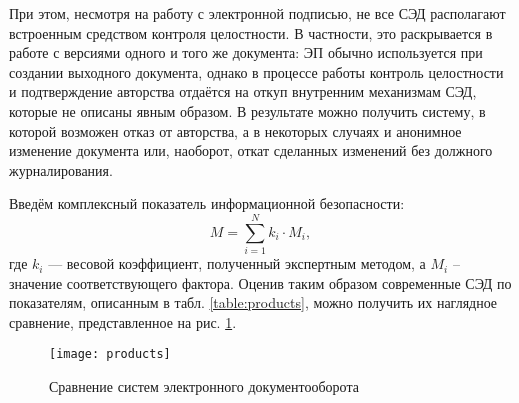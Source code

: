 При этом, несмотря на работу с электронной подписью, не все СЭД располагают встроенным средством контроля целостности. В частности, это раскрывается в работе с версиями одного и того же документа: ЭП обычно используется при создании выходного документа, однако в процессе работы контроль целостности и подтверждение авторства отдаётся на откуп внутренним механизмам СЭД, которые не описаны явным образом. В результате можно получить систему, в которой возможен отказ от авторства, а в некоторых случаях и анонимное изменение документа или, наоборот, откат сделанных изменений без должного журналирования.

\vspace{\baselineskip}
Введём комплексный показатель информационной безопасности:
\begin{equation}
  \label{eq:complex}
M = \sum_{i=1}^N k_i \cdot M_i,
\end{equation}
где $k_i$ --- весовой коэффициент, полученный экспертным методом, а $M_i$ -- значение соответствующего фактора.
Оценив таким образом современные СЭД по показателям, описанным в табл. \ref{table:products}, можно получить их наглядное сравнение, представленное на рис. \ref{img:products}.

\begin{figure}[h!]
  \centering
  \texttt{[image: products]}
  \caption{Сравнение систем электронного документооборота}
  \label{img:products}
\end{figure}


